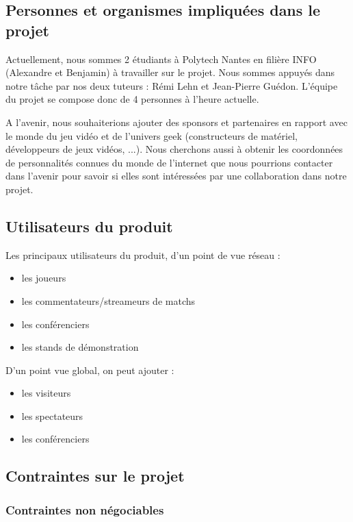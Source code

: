\documentclass[french]{article}
\begin{document}
\subsection{Personnes et organismes impliquées dans le projet}

Actuellement, nous sommes 2 étudiants à Polytech Nantes en filière INFO (Alexandre et Benjamin) à travailler sur le projet.
Nous sommes appuyés dans notre tâche par nos deux tuteurs : Rémi Lehn et Jean-Pierre Guédon.
L'équipe du projet se compose donc de 4 personnes à l'heure actuelle.

A l'avenir, nous souhaiterions ajouter des sponsors et partenaires en rapport avec le monde du jeu vidéo et de l'univers geek (constructeurs de matériel, développeurs de jeux vidéos, ...).
Nous cherchons aussi à obtenir les coordonnées de personnalités connues du monde de l'internet que nous pourrions contacter dans l'avenir pour savoir si elles sont intéressées par une collaboration dans notre projet.

\subsection{Utilisateurs du produit}

Les principaux utilisateurs du produit, d'un point de vue réseau :
\begin{itemize}
	\item les joueurs
	\item les commentateurs/streameurs de matchs
	\item les conférenciers
	\item les stands de démonstration
\end{itemize}

D'un point vue global, on peut ajouter :
\begin{itemize}
	\item les visiteurs
	\item les spectateurs
	\item les conférenciers
\end{itemize}

\subsection{Contraintes sur le projet}

\subsubsection{Contraintes non négociables}
\end{document}
